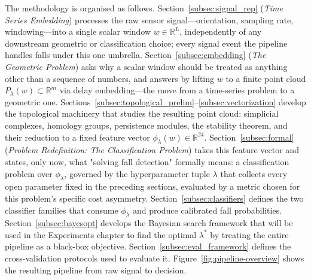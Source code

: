 \documentclass[onluarkali,ingilizce,yukseklisans,karton,LisansustuEgitim]{itutez}
\providecommand{\R}{\mathbb{R}}
\providecommand{\1}{\mathbf{1}}
\begin{document}
The methodology is organised as follows. Section~\ref{subsec:signal_rep} (\emph{Time Series Embedding}) processes the raw sensor signal---orientation, sampling rate, windowing---into a single scalar window $w\in\R^L$, independently of any downstream geometric or classification choice; every signal event the pipeline handles falls under this one umbrella. Section~\ref{subsec:embedding} (\emph{The Geometric Problem}) asks why a scalar window should be treated as anything other than a sequence of numbers, and answers by lifting $w$ to a finite point cloud $P_\lambda(w)\subset\R^m$ via delay embedding---the move from a time-series problem to a geometric one. Sections~\ref{subsec:topological_prelim}--\ref{subsec:vectorization} develop the topological machinery that studies the resulting point cloud: simplicial complexes, homology groups, persistence modules, the stability theorem, and their reduction to a fixed feature vector $\phi_\lambda(w)\in\R^{24}$. Section~\ref{subsec:formal} (\emph{Problem Redefinition: The Classification Problem}) takes this feature vector and states, only now, what "solving fall detection" formally means: a classification problem over $\phi_\lambda$, governed by the hyperparameter tuple $\lambda$ that collects every open parameter fixed in the preceding sections, evaluated by a metric chosen for this problem's specific cost asymmetry. Section~\ref{subsec:classifiers} defines the two classifier families that consume $\phi_\lambda$ and produce calibrated fall probabilities. Section~\ref{subsec:bayesopt} develops the Bayesian search framework that will be used in the Experiments chapter to find the optimal $\lambda^*$ by treating the entire pipeline as a black-box objective. Section~\ref{subsec:eval_framework} defines the cross-validation protocols used to evaluate it. Figure~\ref{fig:pipeline-overview} shows the resulting pipeline from raw signal to decision.
\end{document}
